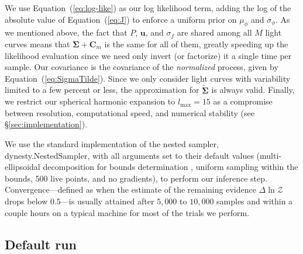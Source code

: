 \documentclass[modern]{aastex62}
\begin{document}
We use Equation~(\ref{eq:log-like}) as our log likelihood
term, adding the log of the absolute value of Equation~(\ref{eq:J}) to
enforce a uniform prior on $\mu_\phi$ and $\sigma_\phi$. As we mentioned
above, the fact that $P$, $\mathbf{u}$, and $\sigma_f$ are shared among
all $M$ light curves means that $\pmb{\Sigma} + \mathbf{C}_m$ is the same for all
of them, greatly speeding up the likelihood evaluation since we need
only invert (or factorize) it a single time per sample. Our
covariance is the covariance of the \emph{normalized} process,
given by Equation~(\ref{eq:SigmaTilde}). Since we only consider light curves
with variability limited to a few percent or less, the approximation for
$\tilde{\pmb{\Sigma}}$ is always valid. Finally, we restrict our spherical
harmonic expansion to $l_\mathrm{max} = 15$ as a compromise between
resolution, computational speed, and numerical stability (see \S\ref{sec:implementation}).

We use the standard implementation of the nested sampler,
\textsf{dynesty.NestedSampler}, with all arguments set to their
default values
(multi-ellipsoidal decomposition for bounds determination \citep{Feroz2009},
uniform sampling within the bounds,
500 live points,
and no gradients), to perform our inference step.
Convergence---defined as when the estimate of the remaining evidence $\Delta\ln \mathcal{Z}$ drops
below $0.5$---is usually attained after $5{,}000$ to $10{,}000$ samples and
within a couple hours on a typical machine for most of the trials we perform.

\subsection{Default run}
\label{sec:inference-default}
\end{document}
